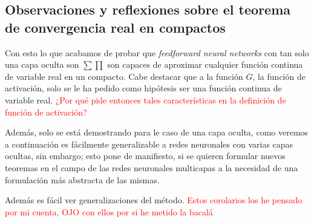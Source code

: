 \subsection{Observaciones y reflexiones sobre el teorema de convergencia real en compactos}

Con esto lo que acabamos de probar que \textit{feedforward neural networks} con tan solo una capa oculta son $\sum \prod$ son capaces de aproximar cualquier 
función continua de variable real en un compacto.  Cabe destacar que a la función $G$, la función de activación, solo se le ha pedido como 
hipótesis ser una función continua de variable real. \textcolor{red}{¿Por qué pide entonces tales características en la definición de 
función de activación?}    

Además, solo se está demostrando para le caso de una capa oculta, como veremos a continuación es fácilmente generalizable a redes neuronales 
con varias capas ocultas, sin embargo; esto pone de manifiesto, si se quieren formular nuevos teoremas en el campo de las redes neuronales
multicapas a la necesidad de una formulación más abstracta de las mismas. 

Además es fácil ver generalizaciones del método. 
\textcolor{red}{Estos corolarios los he pensado por mi cuenta, OJO con ellos por si he metido la bacalá}

\begin{corolario}
    
\end{corolario}

\begin{corolario}

\end{corolario}

\begin{corolario}[Generalización de A]
\end{corolario}




